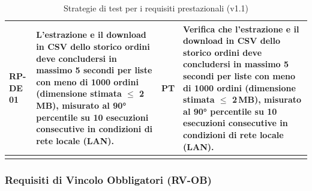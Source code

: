 \documentclass[a4paper,11pt,oneside]{scrartcl}
\begin{document}
\begin{longtable}{|p{1.5cm}|p{5.5cm}|p{1.8cm}|p{5cm}|}
    RP-DE 01         & L'estrazione e il download in CSV dello storico ordini deve concludersi in massimo 5 secondi per liste con meno di 1000 ordini (dimensione stimata $\leq$ 2\,MB), misurato al 90° percentile su 10 esecuzioni consecutive in condizioni di rete locale (LAN). & PT                 & Verifica che l'estrazione e il download in CSV dello storico ordini deve concludersi in massimo 5 secondi per liste con meno di 1000 ordini (dimensione stimata $\leq$ 2\,MB), misurato al 90° percentile su 10 esecuzioni consecutive in condizioni di rete locale (LAN). \\ \hline
    \caption{Strategie di test per i requisiti prestazionali (v1.1)}
\end{longtable}

\newpage
\subsubsection{Requisiti di Vincolo Obbligatori (RV-OB)}
\end{document}
